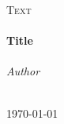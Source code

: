 \begin{titlepage}

  \begin{center} 
    \textsc{\Large Text}\\[0.5cm]

    \HRule\\[0.4cm]
    {\huge \bfseries Title\\[0.4cm]}
    \HRule\\[1.5cm]

    \emph{Author}\\[0.1cm]
    \noindent{}\\[1cm]


    \vfill

    {\large \today}

  \end{center}
\end{titlepage}
